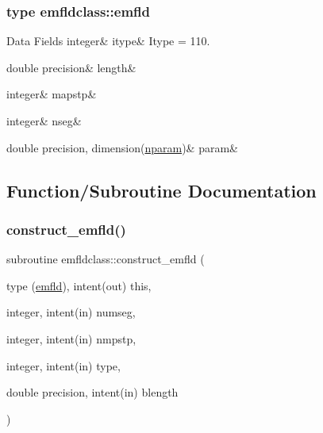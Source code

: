 \subsubsection{type emfldclass\+::emfld}
\begin{DoxyFields}{Data Fields}
\mbox{\label{namespaceemfldclass_aa9a88075072a030b64fd3878793b499b}} 
integer&
itype&
Itype = 110. \\
\hline

\mbox{\label{namespaceemfldclass_a4938896636fb9fa907f15b621831cf97}} 
double precision&
length&
\\
\hline

\mbox{\label{namespaceemfldclass_ac18dfbe320fc1dc13393780eb0ae2613}} 
integer&
mapstp&
\\
\hline

\mbox{\label{namespaceemfldclass_a35f0c51ff70d545cef92bbbfa9546006}} 
integer&
nseg&
\\
\hline

\mbox{\label{namespaceemfldclass_ac4480d690e4e4d88d88ba939af8213cd}} 
double precision, dimension(\mbox{\hyperlink{namespaceemfldclass_ad6fed90f4153b92a9a9ff35a6ef146c3}{nparam}})&
param&
\\
\hline

\end{DoxyFields}


\subsection{Function/\+Subroutine Documentation}
\mbox{\label{namespaceemfldclass_a2a7e6a32e149f3dc82fbbc59d5c6ec2d}} 
\subsubsection{\texorpdfstring{construct\_emfld()}{construct\_emfld()}}
{\footnotesize\ttfamily subroutine emfldclass\+::construct\+\_\+emfld (\begin{DoxyParamCaption}\item[{type (\mbox{\hyperlink{namespaceemfldclass_structemfldclass_1_1emfld}{emfld}}), intent(out)}]{this,  }\item[{integer, intent(in)}]{numseg,  }\item[{integer, intent(in)}]{nmpstp,  }\item[{integer, intent(in)}]{type,  }\item[{double precision, intent(in)}]{blength }\end{DoxyParamCaption})}

